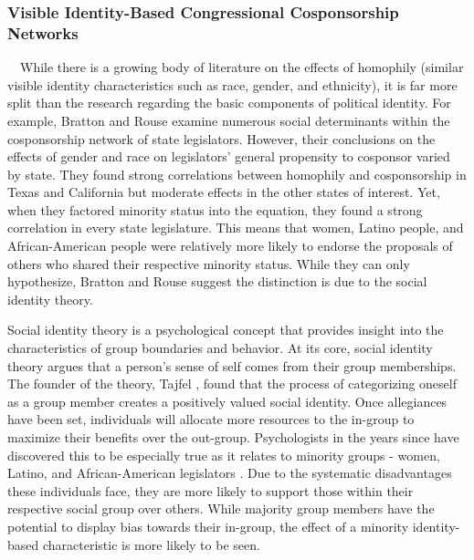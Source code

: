 \documentclass[Royal,times,sageh]{sagej}
\begin{document}
\hypertarget{visible-identity-based-congressional-cosponsorship-networks}{%
\subsubsection{Visible Identity-Based Congressional Cosponsorship
Networks}\label{visible-identity-based-congressional-cosponsorship-networks}}

~~While there is a growing body of literature on the effects of
homophily (similar visible identity characteristics such as race,
gender, and ethnicity), it is far more split than the research regarding
the basic components of political identity. For example, Bratton and
Rouse \citeyearpar{bratton2011} examine numerous social determinants
within the cosponsorship network of state legislators. However, their
conclusions on the effects of gender and race on legislators' general
propensity to cosponsor varied by state. They found strong correlations
between homophily and cosponsorship in Texas and California but moderate
effects in the other states of interest. Yet, when they factored
minority status into the equation, they found a strong correlation in
every state legislature. This means that women, Latino people, and
African-American people were relatively more likely to endorse the
proposals of others who shared their respective minority status. While
they can only hypothesize, Bratton and Rouse \citeyearpar{bratton2011}
suggest the distinction is due to the social identity theory.

Social identity theory is a psychological concept that provides insight
into the characteristics of group boundaries and behavior. At its core,
social identity theory argues that a person's sense of self comes from
their group memberships. The founder of the theory, Tajfel
\citeyearpar{tajfel}, found that the process of categorizing oneself as
a group member creates a positively valued social identity. Once
allegiances have been set, individuals will allocate more resources to
the in-group to maximize their benefits over the out-group.
Psychologists in the years since have discovered this to be especially
true as it relates to minority groups - women, Latino, and
African-American legislators \citep{huddy2004}. Due to the systematic
disadvantages these individuals face, they are more likely to support
those within their respective social group over others. While majority
group members have the potential to display bias towards their in-group,
the effect of a minority identity-based characteristic is more likely to
be seen.
\end{document}
